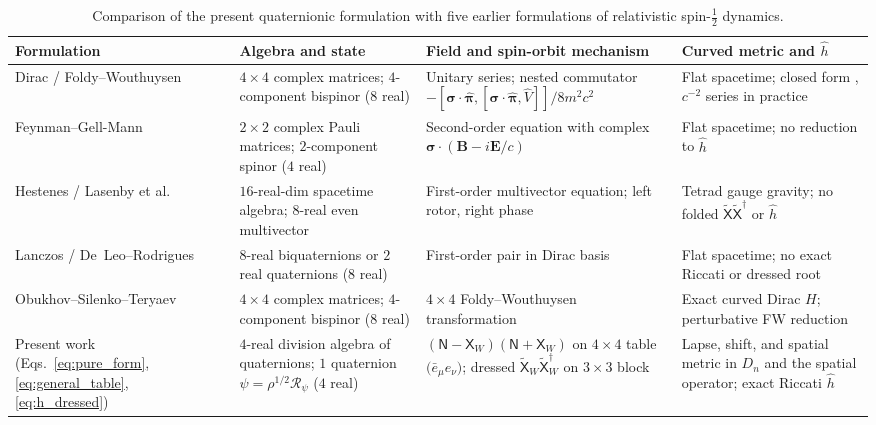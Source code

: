 \documentclass[aps,prd,onecolumn,tightenlines,nofootinbib,notitlepage,11pt,floatfix]{revtex4-2}
\theoremstyle{indentedtheorem}
\begin{document}
\begin{table}[htbp]
\centering
\caption{Comparison of the present quaternionic formulation with five earlier formulations of relativistic spin-$\tfrac{1}{2}$ dynamics.}
\label{tab:formulations}
\fontsize{10}{11.5}\selectfont
\begin{tabular}{@{}p{3.4cm}p{3.0cm}p{4.3cm}p{3.5cm}@{}}
\toprule
\textbf{Formulation} & \textbf{Algebra and state} & \textbf{Field and spin-orbit mechanism} & \textbf{Curved metric and $\hat{h}$} \\
\midrule
Dirac / Foldy--Wouthuysen \citep{Dirac1928Quantum,Foldy1950Dirac} & $4\times4$ complex matrices; $4$-component bispinor ($8$ real) & Unitary series; nested commutator $-[\boldsymbol{\sigma}\cdot\hat{\boldsymbol{\pi}},[\boldsymbol{\sigma}\cdot\hat{\boldsymbol{\pi}},\hat{V}]]/8m^2c^2$ & Flat spacetime; closed form \citep{Eriksen1958Foldy}, $c^{-2}$ series in practice \\
\addlinespace
Feynman--Gell-Mann \citep{FeynmanGellMann1958Theory} & $2\times2$ complex Pauli matrices; $2$-component spinor ($4$ real) & Second-order equation with complex $\boldsymbol{\sigma}\cdot(\mathbf{B}-i\mathbf{E}/c)$ & Flat spacetime; no reduction to $\hat{h}$ \\
\addlinespace
Hestenes / Lasenby et al. \citep{Hestenes1967Real,LasenbyDoranGull1998Gravity} & $16$-real-dim spacetime algebra; $8$-real even multivector & First-order multivector equation; left rotor, right phase & Tetrad gauge gravity; no folded $\tilde{\mathsf{X}}\tilde{\mathsf{X}}^\dagger$ or $\hat{h}$ \\
\addlinespace
Lanczos / De~Leo--Rodrigues \citep{Lanczos1929Tensoranalytischen,DeLeoRodrigues1998Quaternionic} & $8$-real biquaternions or $2$ real quaternions ($8$ real) & First-order pair in Dirac basis & Flat spacetime; no exact Riccati or dressed root \\
\addlinespace
Obukhov--Silenko--Teryaev \citep{ObukhovSilenkoTeryaev2011Dirac} & $4\times4$ complex matrices; $4$-component bispinor ($8$ real) & $4\times4$ Foldy--Wouthuysen transformation & Exact curved Dirac $H$; perturbative FW reduction \\
\addlinespace
Present work (Eqs.~\eqref{eq:pure_form}, \eqref{eq:general_table}, \eqref{eq:h_dressed}) & $4$-real division algebra of quaternions; $1$ quaternion $\psi=\rho^{1/2}\mathcal{R}_\psi$ ($4$ real) & $(\mathsf{N}-\mathsf{X}_W)(\mathsf{N}+\mathsf{X}_W)$ on $4\times4$ table $\big(\bar{e}_\mu e_\nu\big)$; dressed $\tilde{\mathsf{X}}_W\tilde{\mathsf{X}}_W^\dagger$ on $3\times3$ block & Lapse, shift, and spatial metric in $D_n$ and the spatial operator; exact Riccati $\hat{h}$ \\
\bottomrule
\end{tabular}
\end{table}
\end{document}
